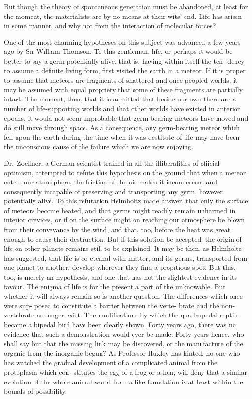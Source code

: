 \documentclass[]{book}
\begin{document}
But though the theory of spontaneous generation must be abandoned, at
least for the moment, the materialists are by no means at their wits'
end. Life has arisen in some manner, and why not from the interaction of
molecular forces?

One of the most charming hypotheses on this subject was advanced a few
years ago by Sir William Thomson. To this gentleman, life, or perhaps it
would be better to say a germ potentially alive, that is, having within
itself the ten- dency to assume a definite living form, first visited
the earth in a meteor. If it is proper to assume that meteors are
fragments of shattered and once peopled worlds, it may be assumed with
equal propriety that some of these fragments are partially intact. The
moment, then, that it is admitted that beside our own there are a number
of life-supporting worlds and that other worlds have existed in anterior
epochs, it would not seem improbable that germ-bearing meteors have
moved and do still move through space. As a consequence, any
germ-bearing meteor which fell upon the earth during the time when it
was destitute of life may have been the unconscious cause of the failure
which we are now enjoying.

Dr.~Zoellner, a German scientist trained in all the illiberalities of
ofiicial optimism, attempted to refute this hypothesis on the ground
that when a meteor enters our atmosphere, the friction of the air makes
it incandescent and consequently incapable of preserving and
transporting any germ, however potentially alive. To this refutation
Helmholtz made answer, that only the surface of meteors become heated,
and that germs might readily remain unharmed in interior crevices, or if
on the surface might on reaching our atmosphere be blown from their
conveyance by the wind, and that, too, before the heat was great enough
to cause their destruction. But if this solution be accepted, the origin
of life on other planets remains still to be explained. It may be then,
as Helmholtz has suggested, that life is co-eternal with matter, and its
germs, transported from one planet to another, develop wherever they
find a propitious spot. But this, too, is merely an hypothesis, and one
that has not the slightest evidence in its favour. The enigma of life is
for the present a part of the unknowable. But whether it will always
remain so is another question. The differences which once were sup-
posed to constitute a barrier between the verte- brate and the
non-vertebrate no longer exist. The modifications by which the
quadrupedal reptile became a bipedal bird have been clearly shown. Forty
years ago, there was no evidence that such a demonstration would ever be
made. Forty years hence, who shall say but that the missing link may be
discovered, or the manufacture of the organic from the inorganic begun?
As Professor Huxley has hinted, no one who has watched the gradual
development of a complicated animal from the protoplasm which con-
stitutes the egg of a frog or a hen, will deny that a similar evolution
of the whole animal world from a like foundation is at least within the
bounds of possibility.
\end{document}
